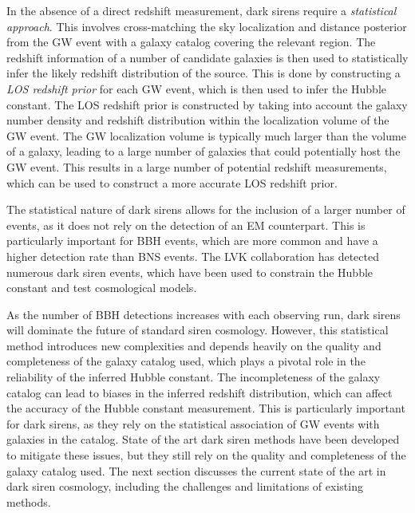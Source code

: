 In the absence of a direct redshift measurement, dark sirens require a \textit{statistical approach}. This involves cross-matching the sky localization and distance posterior from the \ac{GW} event with a galaxy catalog covering the relevant region. The redshift information of a number of candidate galaxies is then used to statistically infer the likely redshift distribution of the source. This is done by constructing a \textit{\ac{LOS} redshift prior} for each \ac{GW} event, which is then used to infer the Hubble constant. The LOS redshift prior is constructed by taking into account the galaxy number density and redshift distribution within the localization volume of the \ac{GW} event. The \ac{GW} localization volume is typically much larger than the volume of a galaxy, leading to a large number of galaxies that could potentially host the \ac{GW} event. This results in a large number of potential redshift measurements, which can be used to construct a more accurate \ac{LOS} redshift prior.

The statistical nature of dark sirens allows for the inclusion of a larger number of events, as it does not rely on the detection of an \ac{EM} counterpart. This is particularly important for \ac{BBH} events, which are more common and have a higher detection rate than \ac{BNS} events. 
The \ac{LVK} collaboration has detected numerous dark siren events, which have been used to constrain the Hubble constant and test cosmological models.

As the number of \ac{BBH} detections increases with each observing run, dark sirens will dominate the future of standard siren cosmology. However, this statistical method introduces new complexities and depends heavily on the quality and completeness of the galaxy catalog used, which plays a pivotal role in the reliability of the inferred Hubble constant. The incompleteness of the galaxy catalog can lead to biases in the inferred redshift distribution, which can affect the accuracy of the Hubble constant measurement. This is particularly important for dark sirens, as they rely on the statistical association of \ac{GW} events with galaxies in the catalog. State of the art dark siren methods have been developed to mitigate these issues, but they still rely on the quality and completeness of the galaxy catalog used. The next section discusses the current state of the art in dark siren cosmology, including the challenges and limitations of existing methods.

